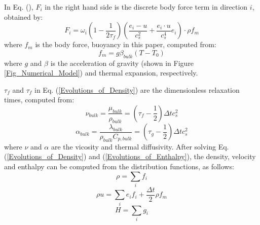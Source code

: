 \documentclass[preprint,12pt]{elsarticle}
\begin{document}
In Eq. (), $F_i$ in the right hand side is the discrete body force term in direction $i$, obtained by:
\begin{equation}
	{F_i} = {\omega _i}\left( {1 - \frac{1}{{2{\tau _f}}}} \right)\left( {\frac{{{e_i} - u}}{{c_s^2}} + \frac{{{e_i} \cdot u}}{{c_s^4}}{e_i}} \right) \cdot {\rho}{f_m}
\end{equation}
where $f_m$ is the body force, buoyancy in this paper, computed from:
\begin{equation}
	f_m=g\beta_{bulk} \left(T-T_0\right)
\end{equation}
where $g$ and $\beta$ is the acceleration of gravity (shown in Figure \ref{Fig_Numerical_Model}) and thermal expansion, respectively.

$\tau_f$ and $\tau_f$ in Eq. (\ref{Evolutions_of_Density}) are the dimensionless relaxation times, computed from:
\begin{equation}
	\nu_{bulk} = \frac{\mu_{bulk}}{\rho_{bulk}} = \left( {{\tau _f} - \frac{1}{2}} \right)\Delta tc_s^2
\end{equation}
\begin{equation}
	\alpha_{bulk} =\frac{\lambda_{bulk}}{\rho_{bulk} C_{p,bulk}} = \left( {{\tau _g} - \frac{1}{2}} \right)\Delta tc_s^2
\end{equation}
where $\nu$ and $\alpha$ are the vicosity and thermal diffusivity. After solving Eq. (\ref{Evolutions_of_Density}) and (\ref{Evolutions_of_Enthalpy}), the density, velocity and enthalpy can be computed from the distribution functions, as follows:
\begin{equation}
	\rho  = \sum\limits_i {{f_i}} 
\end{equation}
\begin{equation}
	{\rho}u = \sum\limits_i {{e_i}{f_i}}  + \frac{{\Delta t}}{2}{\rho}{f_m}
\end{equation}
\begin{equation}
	H = \sum\limits_i {{g_i}} 
\end{equation}
\end{document}
